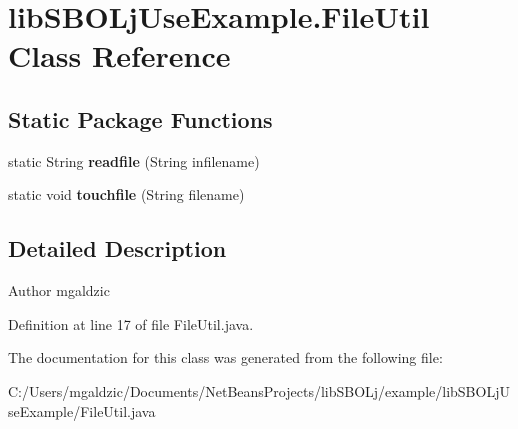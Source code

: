 \hypertarget{classlib_s_b_o_lj_use_example_1_1_file_util}{
\section{libSBOLjUseExample.FileUtil Class Reference}
\label{classlib_s_b_o_lj_use_example_1_1_file_util}
}
\subsection*{Static Package Functions}
\begin{DoxyCompactItemize}
\item 
\hypertarget{classlib_s_b_o_lj_use_example_1_1_file_util_a37e18da0a1797aeb33dea7b8e1b48671}{
static String {\bfseries readfile} (String infilename)}
\label{classlib_s_b_o_lj_use_example_1_1_file_util_a37e18da0a1797aeb33dea7b8e1b48671}

\item 
\hypertarget{classlib_s_b_o_lj_use_example_1_1_file_util_a673a981ce13f8d81dd55be52a76453a8}{
static void {\bfseries touchfile} (String filename)}
\label{classlib_s_b_o_lj_use_example_1_1_file_util_a673a981ce13f8d81dd55be52a76453a8}

\end{DoxyCompactItemize}


\subsection{Detailed Description}
\begin{DoxyAuthor}{Author}
mgaldzic 
\end{DoxyAuthor}


Definition at line 17 of file FileUtil.java.



The documentation for this class was generated from the following file:\begin{DoxyCompactItemize}
\item 
C:/Users/mgaldzic/Documents/NetBeansProjects/libSBOLj/example/libSBOLjUseExample/FileUtil.java\end{DoxyCompactItemize}
